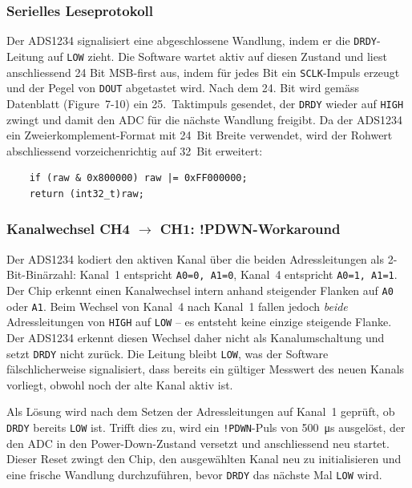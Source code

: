 \documentclass[12pt,a4paper]{article}
\begin{document}
	\subsubsection{Serielles Leseprotokoll}

	Der ADS1234 signalisiert eine abgeschlossene Wandlung, indem er die \texttt{DRDY}-Leitung auf \texttt{LOW} zieht.
	Die Software wartet aktiv auf diesen Zustand und liest anschliessend 24 Bit MSB-first aus, indem für jedes Bit ein \texttt{SCLK}-Impuls erzeugt und der Pegel von \texttt{DOUT} abgetastet wird.
	Nach dem 24. Bit wird gemäss Datenblatt (Figure~7-10) ein 25.~Taktimpuls gesendet, der \texttt{DRDY} wieder auf \texttt{HIGH} zwingt und damit den ADC für die nächste Wandlung freigibt.
	Da der ADS1234 ein Zweierkomplement-Format mit 24~Bit Breite verwendet, wird der Rohwert abschliessend vorzeichenrichtig auf 32~Bit erweitert:

	\begin{verbatim}
	if (raw & 0x800000) raw |= 0xFF000000;
	return (int32_t)raw;
	\end{verbatim}

	\subsubsection{Kanalwechsel CH4 $\rightarrow$ CH1: !PDWN-Workaround}

	Der ADS1234 kodiert den aktiven Kanal über die beiden Adressleitungen als 2-Bit-Binärzahl: Kanal~1 entspricht \texttt{A0=0, A1=0}, Kanal~4 entspricht \texttt{A0=1, A1=1}.
	Der Chip erkennt einen Kanalwechsel intern anhand steigender Flanken auf \texttt{A0} oder \texttt{A1}.
	Beim Wechsel von Kanal~4 nach Kanal~1 fallen jedoch \emph{beide} Adressleitungen von \texttt{HIGH} auf \texttt{LOW} -- es entsteht keine einzige steigende Flanke.
	Der ADS1234 erkennt diesen Wechsel daher nicht als Kanalumschaltung und setzt \texttt{DRDY} nicht zurück.
	Die Leitung bleibt \texttt{LOW}, was der Software fälschlicherweise signalisiert, dass bereits ein gültiger Messwert des neuen Kanals vorliegt, obwohl noch der alte Kanal aktiv ist.

	Als Lösung wird nach dem Setzen der Adressleitungen auf Kanal~1 geprüft, ob \texttt{DRDY} bereits \texttt{LOW} ist.
	Trifft dies zu, wird ein \texttt{!PDWN}-Puls von \SI{500}{\micro\second} ausgelöst, der den ADC in den Power-Down-Zustand versetzt und anschliessend neu startet.
	Dieser Reset zwingt den Chip, den ausgewählten Kanal neu zu initialisieren und eine frische Wandlung durchzuführen, bevor \texttt{DRDY} das nächste Mal \texttt{LOW} wird.
\end{document}
